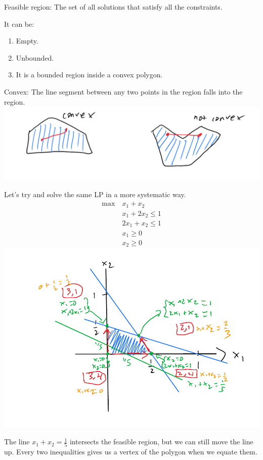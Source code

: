 \documentclass[12 pt]{article}
\begin{document}
        Feasible region: The set of all solutions that satisfy all the
        constraints.

        It can be:
        \begin{enumerate}
        \item Empty.
        \item Unbounded.
        \item It is a bounded region inside a convex polygon.
        \end{enumerate}
        Convex: The line segment between any two points in the region
        falls into the region.
        \\ \includegraphics[width=.9\textwidth]{i107.pdf}

        Let's try and solve the same LP in a more systematic way.
        \begin{align}
          \max\ & x_1 + x_2 \nonumber
          \\ & x_1 + 2x_2 \leq 1
          \\ & 2x_1 + x_2 \leq 1
          \\ & x_1 \geq 0
          \\ & x_2 \geq 0
        \end{align}
        \includegraphics[width=.9\textwidth]{i108.pdf}
        
        The line $x_1 + x_2 = \frac{1}{5}$ intersects the feasible
        region, but we can still move the line up. Every two
        inequalities gives us a vertex of the polygon when we equate
        them.
\end{document}
